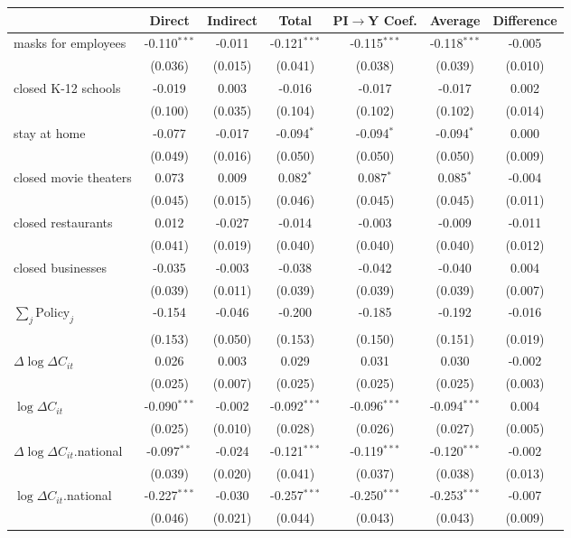 
\begin{tabular}{lccccc|>{}c}
\toprule
  & Direct & Indirect & Total & PI$\to$Y Coef. & Average & Difference\\
\midrule
masks for employees & -0.110$^{***}$ & -0.011 & -0.121$^{***}$ & -0.115$^{***}$ & -0.118$^{***}$ & -0.005\\
 & (0.036) & (0.015) & (0.041) & (0.038) & (0.039) & (0.010)\\
closed K-12 schools & -0.019 & 0.003 & -0.016 & -0.017 & -0.017 & 0.002\\
 & (0.100) & (0.035) & (0.104) & (0.102) & (0.102) & (0.014)\\
stay at home & -0.077 & -0.017 & -0.094$^{*}$ & -0.094$^{*}$ & -0.094$^{*}$ & 0.000\\
 & (0.049) & (0.016) & (0.050) & (0.050) & (0.050) & (0.009)\\
closed movie theaters & 0.073 & 0.009 & 0.082$^{*}$ & 0.087$^{*}$ & 0.085$^{*}$ & -0.004\\
 & (0.045) & (0.015) & (0.046) & (0.045) & (0.045) & (0.011)\\
closed restaurants & 0.012 & -0.027 & -0.014 & -0.003 & -0.009 & -0.011\\
 & (0.041) & (0.019) & (0.040) & (0.040) & (0.040) & (0.012)\\
closed businesses & -0.035 & -0.003 & -0.038 & -0.042 & -0.040 & 0.004\\
 & (0.039) & (0.011) & (0.039) & (0.039) & (0.039) & (0.007)\\
$\sum_j \mathrm{Policy}_j$ & -0.154 & -0.046 & -0.200 & -0.185 & -0.192 & -0.016\\
 & (0.153) & (0.050) & (0.153) & (0.150) & (0.151) & (0.019)\\
$\Delta \log \Delta C_{it}$ & 0.026 & 0.003 & 0.029 & 0.031 & 0.030 & -0.002\\
 & (0.025) & (0.007) & (0.025) & (0.025) & (0.025) & (0.003)\\
$\log \Delta C_{it}$ & -0.090$^{***}$ & -0.002 & -0.092$^{***}$ & -0.096$^{***}$ & -0.094$^{***}$ & 0.004\\
 & (0.025) & (0.010) & (0.028) & (0.026) & (0.027) & (0.005)\\
$\Delta \log \Delta C_{it}$.national & -0.097$^{**}$ & -0.024 & -0.121$^{***}$ & -0.119$^{***}$ & -0.120$^{***}$ & -0.002\\
 & (0.039) & (0.020) & (0.041) & (0.037) & (0.038) & (0.013)\\
$\log \Delta C_{it}$.national & -0.227$^{***}$ & -0.030 & -0.257$^{***}$ & -0.250$^{***}$ & -0.253$^{***}$ & -0.007\\
 & (0.046) & (0.021) & (0.044) & (0.043) & (0.043) & (0.009)\\
\bottomrule
\end{tabular}